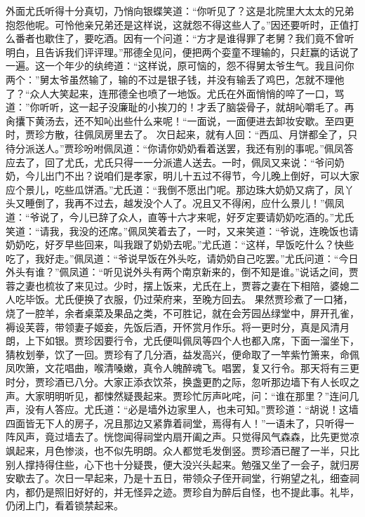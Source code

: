 \documentclass[12pt,oneside]{book}
\begin{document}
外面尤氏听得十分真切，乃悄向银蝶笑道：“你听见了？这是北院里大太太的兄弟抱怨他呢。可怜他亲兄弟还是这样说，这就怨不得这些人了。”因还要听时，正值打么番者也歇住了，要吃酒。因有一个问道：“方才是谁得罪了老舅？我们竟不曾听明白，且告诉我们评评理。”邢德全见问，便把两个娈童不理输的，只赶赢的话说了一遍。这一个年少的纨绔道：“这样说，原可恼的，怨不得舅太爷生气。我且问你两个：”舅太爷虽然输了，输的不过是银子钱，并没有输丢了鸡巴，怎就不理他了？“众人大笑起来，连邢德全也喷了一地饭。尤氏在外面悄悄的啐了一口，骂道：”你听听，这一起子没廉耻的小挨刀的！才丢了脑袋骨子，就胡吣嚼毛了。再肏攮下黄汤去，还不知吣出些什么来呢！“一面说，一面便进去卸妆安歇。至四更时，贾珍方散，往佩凤房里去了。
次日起来，就有人回：“西瓜、月饼都全了，只待分派送人。”贾珍吩咐佩凤道：“你请你奶奶看着送罢，我还有别的事呢。”佩凤答应去了，回了尤氏，尤氏只得一一分派遣人送去。一时，佩凤又来说：“爷问奶奶，今儿出门不出？说咱们是孝家，明儿十五过不得节，今儿晚上倒好，可以大家应个景儿，吃些瓜饼酒。”尤氏道：“我倒不愿出门呢。那边珠大奶奶又病了，凤丫头又睡倒了，我再不过去，越发没个人了。况且又不得闲，应什么景儿！”佩凤道：“爷说了，今儿已辞了众人，直等十六才来呢，好歹定要请奶奶吃酒的。”尤氏笑道：“请我，我没的还席。”佩凤笑着去了，一时，又来笑道：“爷说，连晚饭也请奶奶吃，好歹早些回来，叫我跟了奶奶去呢。”尤氏道：“这样，早饭吃什么？快些吃了，我好走。”佩凤道：“爷说早饭在外头吃，请奶奶自己吃罢。”尤氏问道：“今日外头有谁？”佩凤道：“听见说外头有两个南京新来的，倒不知是谁。”说话之间，贾蓉之妻也梳妆了来见过。少时，摆上饭来，尤氏在上，贾蓉之妻在下相陪，婆媳二人吃毕饭。尤氏便换了衣服，仍过荣府来，至晚方回去。
果然贾珍煮了一口猪，烧了一腔羊，余者桌菜及果品之类，不可胜记，就在会芳园丛绿堂中，屏开孔雀，褥设芙蓉，带领妻子姬妾，先饭后酒，开怀赏月作乐。将一更时分，真是风清月朗，上下如银。贾珍因要行令，尤氏便叫佩凤等四个人也都入席，下面一溜坐下，猜枚划拳，饮了一回。贾珍有了几分酒，益发高兴，便命取了一竿紫竹箫来，命佩凤吹箫，文花唱曲，喉清嗓嫩，真令人魄醉魂飞。唱罢，复又行令。那天将有三更时分，贾珍酒已八分。大家正添衣饮茶，换盏更酌之际，忽听那边墙下有人长叹之声。大家明明听见，都悚然疑畏起来。贾珍忙厉声叱咤，问：“谁在那里？”连问几声，没有人答应。尤氏道：“必是墙外边家里人，也未可知。”贾珍道：“胡说！这墙四面皆无下人的房子，况且那边又紧靠着祠堂，焉得有人！”一语未了，只听得一阵风声，竟过墙去了。恍惚闻得祠堂内扇开阖之声。只觉得风气森森，比先更觉凉飒起来，月色惨淡，也不似先明朗。众人都觉毛发倒竖。贾珍酒已醒了一半，只比别人撑持得住些，心下也十分疑畏，便大没兴头起来。勉强又坐了一会子，就归房安歇去了。次日一早起来，乃是十五日，带领众子侄开祠堂，行朔望之礼，细查祠内，都仍是照旧好好的，并无怪异之迹。贾珍自为醉后自怪，也不提此事。礼毕，仍闭上门，看着锁禁起来。
\end{document}
